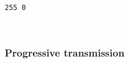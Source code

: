     \begin{Verbatim}[commandchars=\\\{\}]
255 0

    \end{Verbatim}

    \begin{center}
    \end{center}
    { \hspace*{\fill} \\}
    
    \hypertarget{progressive-transmission}{%
\subsubsection{Progressive
transmission}\label{progressive-transmission}}

